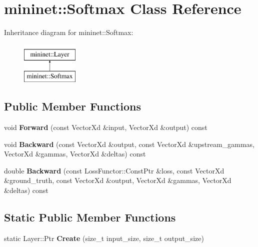 \hypertarget{classmininet_1_1_softmax}{}\section{mininet\+:\+:Softmax Class Reference}
\label{classmininet_1_1_softmax}
Inheritance diagram for mininet\+:\+:Softmax\+:\begin{figure}[H]
\begin{center}
\leavevmode
\includegraphics[height=2.000000cm]{classmininet_1_1_softmax}
\end{center}
\end{figure}
\subsection*{Public Member Functions}
\begin{DoxyCompactItemize}
\item 
\hypertarget{classmininet_1_1_softmax_a9305e1361a9da25ed3f528aaeeb20375}{}\label{classmininet_1_1_softmax_a9305e1361a9da25ed3f528aaeeb20375} 
void {\bfseries Forward} (const Vector\+Xd \&input, Vector\+Xd \&output) const
\item 
\hypertarget{classmininet_1_1_softmax_ab4dc8f98bd510e6094efef208a78703c}{}\label{classmininet_1_1_softmax_ab4dc8f98bd510e6094efef208a78703c} 
void {\bfseries Backward} (const Vector\+Xd \&output, const Vector\+Xd \&upstream\+\_\+gammas, Vector\+Xd \&gammas, Vector\+Xd \&deltas) const
\item 
\hypertarget{classmininet_1_1_softmax_a0cbd69a87c7c960989e55ce315aedaa6}{}\label{classmininet_1_1_softmax_a0cbd69a87c7c960989e55ce315aedaa6} 
double {\bfseries Backward} (const Loss\+Functor\+::\+Const\+Ptr \&loss, const Vector\+Xd \&ground\+\_\+truth, const Vector\+Xd \&output, Vector\+Xd \&gammas, Vector\+Xd \&deltas) const
\end{DoxyCompactItemize}
\subsection*{Static Public Member Functions}
\begin{DoxyCompactItemize}
\item 
\hypertarget{classmininet_1_1_softmax_a8d429f52243b6c42e1fb4caec288ede4}{}\label{classmininet_1_1_softmax_a8d429f52243b6c42e1fb4caec288ede4} 
static Layer\+::\+Ptr {\bfseries Create} (size\+\_\+t input\+\_\+size, size\+\_\+t output\+\_\+size)
\end{DoxyCompactItemize}
